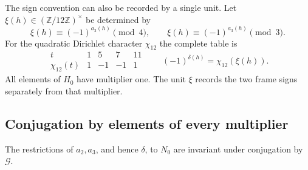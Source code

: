 The sign convention can also be recorded by a single unit. Let
$\xi(h)\in(\mathbb Z/12\mathbb Z)^\times$ be determined by
\[
 \xi(h)\equiv(-1)^{a_2(h)}\pmod4,\qquad
 \xi(h)\equiv(-1)^{a_3(h)}\pmod3.
\]
For the quadratic Dirichlet character $\chi_{12}$ the complete table is
\[
 \begin{array}{c|rrrr}
  t&1&5&7&11\\ \hline
  \chi_{12}(t)&1&-1&-1&1
 \end{array}
 \qquad (-1)^{\delta(h)}=\chi_{12}(\xi(h)).
\]
All elements of $H_0$ have multiplier one. The unit $\xi$ records
the two frame signs separately from that multiplier.

\subsection{Conjugation by elements of every multiplier}

\begin{proposition}\label{prop:frame-sign-conjugation}
The restrictions of $a_2,a_3$, and hence $\delta$, to $N_0$ are
invariant under conjugation by $\mathcal G$.
\end{proposition}

